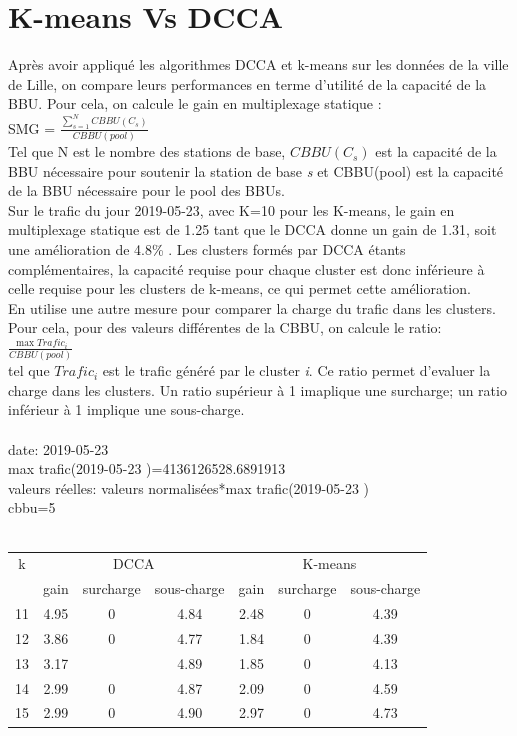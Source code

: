 \documentclass{report}
\begin{document}
\section{K-means Vs DCCA}
Après avoir appliqué les algorithmes DCCA et k-means sur les données de la ville de Lille, on compare leurs performances en terme d'utilité de la capacité de la BBU. 
Pour cela, on calcule le gain en multiplexage statique :\\
SMG = $\frac{\sum_{s=1}^N CBBU(C_{s})} {CBBU(pool)}$  \\
Tel que N est le nombre des stations de base, $CBBU(C_{s})$ est la capacité de la BBU nécessaire pour soutenir la station 
de base \emph{s} et CBBU(pool) est la capacité de la BBU nécessaire pour le pool des BBUs.\\
Sur le trafic du jour 2019-05-23, avec K=10 pour les K-means, le gain en multiplexage statique est de 1.25 tant que le DCCA 
donne un gain de 1.31, soit une amélioration de 4.8\% . Les clusters formés par DCCA étants complémentaires, la capacité requise 
pour chaque cluster est donc inférieure à celle requise pour les clusters de k-means, ce qui permet cette amélioration.\\
En utilise une autre mesure pour comparer la charge du trafic dans les clusters. Pour cela, pour des valeurs différentes 
de la CBBU, on calcule le ratio:\\
 $\frac{\max{Trafic_{i}}} {CBBU(pool)}$ 
 \\tel que $Trafic_{i}$ est le trafic généré par le cluster \emph{i}. 
Ce ratio permet d'evaluer la charge dans les clusters. Un ratio supérieur à 1 imaplique une surcharge; un ratio inférieur à 1 implique une sous-charge.
\\\\
date: 2019-05-23\\
max trafic(2019-05-23 )=4136126528.6891913 \\
valeurs réelles: valeurs normalisées*max trafic(2019-05-23 )\\
cbbu=5\\\\
\begin{tabular}{|c|c|c|c|c|c|c|}
\hline
k & \multicolumn{3}{c|}{DCCA} & \multicolumn{3}{c|}{K-means}\\ 
\cline{2-6} 
        & gain & surcharge & sous-charge  & gain & surcharge & sous-charge  \\   
\hline
11 & 4.95 & 0 & 4.84 & 2.48 & 0 & 4.39 \\
\hline
12 & 3.86 & 0 & 4.77 & 1.84 & 0 & 4.39 \\
\hline
13 & 3.17 &  & 4.89 & 1.85 & 0 & 4.13\\
\hline
14 & 2.99 & 0 & 4.87 & 2.09 & 0 & 4.59\\
\hline
15 & 2.99 & 0 & 4.90 & 2.97 & 0 & 4.73 \\
\hline
\end{tabular}
\end{document}

